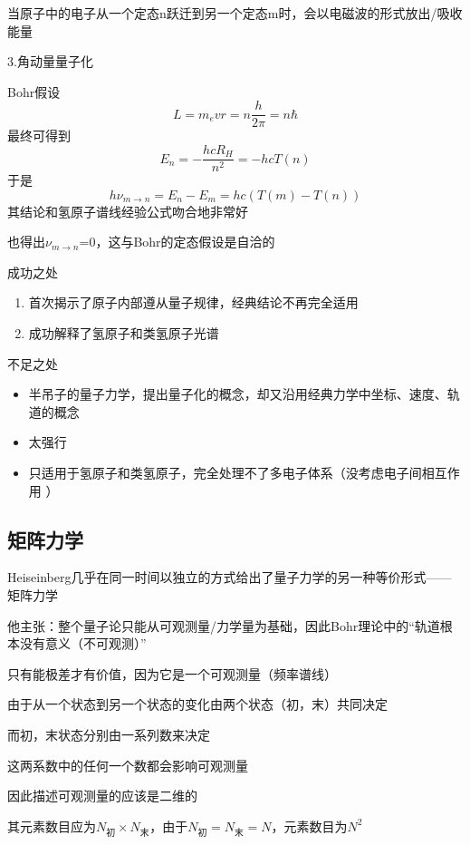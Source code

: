 \documentclass[lang=cn,15pt]{elegantbook}
\begin{document}
当原子中的电子从一个定态n跃迁到另一个定态m时，会以电磁波的形式放出/吸收能量

3.角动量量子化

Bohr假设
\begin{equation}
	L=m_evr=n\frac{h}{2\pi}=n\hbar
\end{equation}
最终可得到
\begin{equation}
	E_n=-\frac{hcR_H}{n^2}=-hcT(n)
\end{equation}
于是
\begin{equation}
	h\nu_{m\rightarrow n}=E_n-E_m=hc(T(m)-T(n))
\end{equation}
其结论和氢原子谱线经验公式吻合地非常好

也得出$\nu_{m\rightarrow n}$=0，这与Bohr的定态假设是自洽的

成功之处
\begin{enumerate}
	\item 首次揭示了原子内部遵从量子规律，经典结论不再完全适用
	
	\item 成功解释了氢原子和类氢原子光谱
\end{enumerate}

不足之处
\begin{itemize}
	\item 半吊子的量子力学，提出量子化的概念，却又沿用经典力学中坐标、速度、轨道的概念
	\item 太强行
	\item 只适用于氢原子和类氢原子，完全处理不了多电子体系（没考虑电子间相互作用  ）
\end{itemize}
\subsection{矩阵力学}

Heiseinberg几乎在同一时间以独立的方式给出了量子力学的另一种等价形式——矩阵力学

他主张：整个量子论只能从可观测量/力学量为基础，因此Bohr理论中的“轨道根本没有意义（不可观测）”

只有能极差才有价值，因为它是一个可观测量（频率谱线）

由于从一个状态到另一个状态的变化由两个状态（初，末）共同决定

而初，末状态分别由一系列数来决定

这两系数中的任何一个数都会影响可观测量

因此描述可观测量的应该是二维的

其元素数目应为$N_{\text{初}}\times N_{\text{末}} $，由于$N_{\text{初}}= N_{\text{末}} =N$，元素数目为$N^2$
\end{document}
